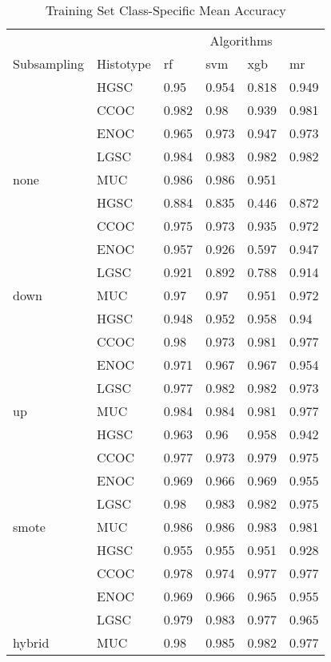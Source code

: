 \documentclass[
]{report}
\begin{document}
\begin{table}

\caption{\label{tab:train-accuracy-class-table}Training Set Class-Specific Mean Accuracy}
\centering
\begin{tabular}[t]{l|l|l|l|l|l}
\hline
\multicolumn{2}{c|}{ } & \multicolumn{4}{c}{Algorithms} \\
\cline{3-6}
Subsampling & Histotype & rf & svm & xgb & mr\\
\hline
 & HGSC & 0.95 & 0.954 & 0.818 & 0.949\\
\cline{2-6}
 & CCOC & 0.982 & 0.98 & 0.939 & 0.981\\
\cline{2-6}
 & ENOC & 0.965 & 0.973 & 0.947 & 0.973\\
\cline{2-6}
 & LGSC & 0.984 & 0.983 & 0.982 & 0.982\\
\cline{2-6}
\multirow{-5}{*}{\raggedright\arraybackslash none} & MUC & 0.986 & 0.986 & 0.951 & \cellcolor[HTML]{90ee90}{0.988}\\
\cline{1-6}
 & HGSC & 0.884 & 0.835 & 0.446 & 0.872\\
\cline{2-6}
 & CCOC & 0.975 & 0.973 & 0.935 & 0.972\\
\cline{2-6}
 & ENOC & 0.957 & 0.926 & 0.597 & 0.947\\
\cline{2-6}
 & LGSC & 0.921 & 0.892 & 0.788 & 0.914\\
\cline{2-6}
\multirow{-5}{*}{\raggedright\arraybackslash down} & MUC & 0.97 & 0.97 & 0.951 & 0.972\\
\cline{1-6}
 & HGSC & 0.948 & 0.952 & 0.958 & 0.94\\
\cline{2-6}
 & CCOC & 0.98 & 0.973 & 0.981 & 0.977\\
\cline{2-6}
 & ENOC & 0.971 & 0.967 & 0.967 & 0.954\\
\cline{2-6}
 & LGSC & 0.977 & 0.982 & 0.982 & 0.973\\
\cline{2-6}
\multirow{-5}{*}{\raggedright\arraybackslash up} & MUC & 0.984 & 0.984 & 0.981 & 0.977\\
\cline{1-6}
 & HGSC & 0.963 & 0.96 & 0.958 & 0.942\\
\cline{2-6}
 & CCOC & 0.977 & 0.973 & 0.979 & 0.975\\
\cline{2-6}
 & ENOC & 0.969 & 0.966 & 0.969 & 0.955\\
\cline{2-6}
 & LGSC & 0.98 & 0.983 & 0.982 & 0.975\\
\cline{2-6}
\multirow{-5}{*}{\raggedright\arraybackslash smote} & MUC & 0.986 & 0.986 & 0.983 & 0.981\\
\cline{1-6}
 & HGSC & 0.955 & 0.955 & 0.951 & 0.928\\
\cline{2-6}
 & CCOC & 0.978 & 0.974 & 0.977 & 0.977\\
\cline{2-6}
 & ENOC & 0.969 & 0.966 & 0.965 & 0.955\\
\cline{2-6}
 & LGSC & 0.979 & 0.983 & 0.977 & 0.965\\
\cline{2-6}
\multirow{-5}{*}{\raggedright\arraybackslash hybrid} & MUC & 0.98 & 0.985 & 0.982 & 0.977\\
\hline
\end{tabular}
\end{table}
\end{document}
